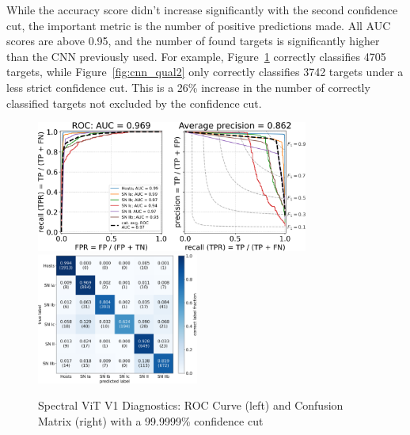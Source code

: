 While the accuracy score didn't increase significantly with the second confidence cut, 
the important metric is the number of positive predictions made. All AUC scores 
are above 0.95, and the number of found targets is significantly higher than the 
CNN previously used. For example, Figure~\ref{fig:v1_999999_qual} correctly 
classifies 4705 targets, while Figure~\ref{fig:cnn_qual2} only correctly classifies 
3742 targets under a less strict confidence cut. This is a 26\% increase in the
number of correctly classified targets not excluded by the confidence cut.

\begin{figure}
    \centering
    \includegraphics[height=4.3cm]{figures/v1_real/vit_model_V1_original_redoroc999999_e31.png}
    \quad
    \includegraphics[height=4.3cm]{figures/v1_real/vit_model_V1_original_redocm999999_e31.png}
    \caption{Spectral ViT V1 Diagnostics: ROC Curve (left) and Confusion Matrix (right) with a 99.9999\% confidence
    cut \label{fig:v1_999999_qual}}
\end{figure}

